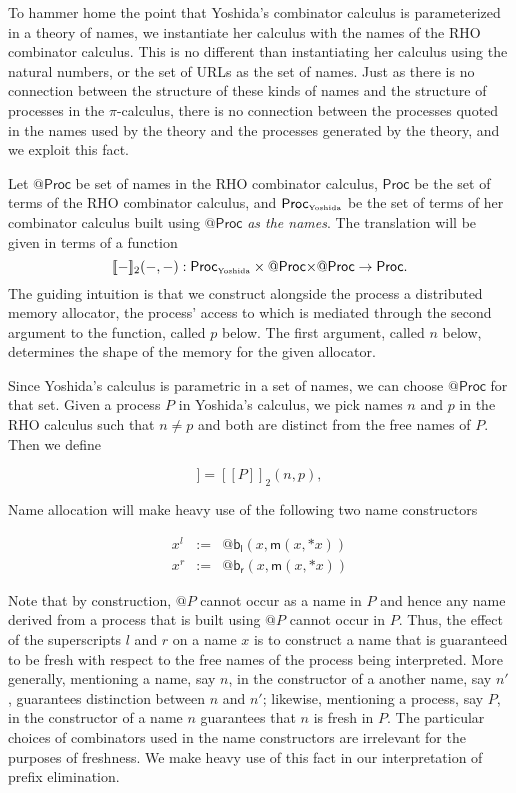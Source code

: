\documentclass{llncs}
\makeatletter
\newcommand{\pic}{$\pi$-calculus}
\newcommand{\ldb}{[\![}
\newcommand{\rdb}{]\!]}
\newcommand{\quotep}[1]{\mathsf{@}#1}
\newcommand{\meaningof}[1]{\ldb #1 \rdb}
\newcommand{\Proc}{\mathsf{Proc}}
\newcommand{\QProc}{\quotep{\mathsf{Proc}}}
\newcommand{\red}{\rightarrow}
\makeatother
\begin{document}
To hammer home the point that Yoshida's combinator calculus is
parameterized in a theory of names, we instantiate her calculus with
the names of the RHO combinator calculus. This is no different than
instantiating her calculus using the natural numbers, or the set of URLs as the
set of names. Just as there is no connection between the structure of
these kinds of names and the structure of processes in the {\pic},
there is no connection between the processes quoted in the names used
by the theory and the processes generated by the theory, and we
exploit this fact.

Let $\QProc$ be set of names in the RHO combinator calculus, $\Proc$
be the set of terms of the RHO combinator calculus, and
$\Proc_{\mbox{\tiny Yoshida}}$ be the set of terms of her combinator
calculus built using $\QProc$ \emph{as the names}. The translation will be
given in terms of a function \[\meaningof{-}_2( -, - ) : 
    \Proc_{\mbox{\tiny Yoshida}} \times \QProc {\times} \QProc \red \Proc.\] 
The guiding intuition is that we construct alongside the process a distributed memory
allocator, the process' access to which is mediated through the second argument
to the function, called $p$ below. The first argument, called $n$ below, determines the shape of the memory for the given allocator.

Since Yoshida's calculus is parametric in a set of names, we can
choose $\QProc$ for that set.  Given a process $P$ in Yoshida's
calculus, we pick names $n$ and $p$ in the RHO calculus such that $n \neq p$
and both are distinct from the free names of $P$.  Then we define

\begin{equation*}
  \meaningof{P} = \meaningof{P}_2(n, p),
\end{equation*}

Name allocation will make heavy use of the following two name
constructors

\begin{eqnarray*}
  x^l & := & \quotep{\mathsf{b}_{\mathsf{l}}(x,\mathsf{m}(x,*x))} \\
  x^r & := & \quotep{\mathsf{b}_{\mathsf{r}}(x,\mathsf{m}(x,*x))}
\end{eqnarray*}

Note that by construction, $\quotep{P}$ cannot occur as a name in $P$
and hence any name derived from a process that is built using
$\quotep{P}$ cannot occur in $P$. Thus, the effect of the superscripts
$l$ and $r$ on a name $x$ is to construct a name that is guaranteed to
be fresh with respect to the free names of the process being
interpreted. More generally, mentioning a name, say $n$, in the
constructor of a another name, say $n'$, guarantees distinction
between $n$ and $n'$; likewise, mentioning a process, say $P$, in the
constructor of a name $n$ guarantees that $n$ is fresh in $P$. The
particular choices of combinators used in the name
constructors are irrelevant for the purposes of freshness. We
make heavy use of this fact in our interpretation of prefix
elimination.
\end{document}
